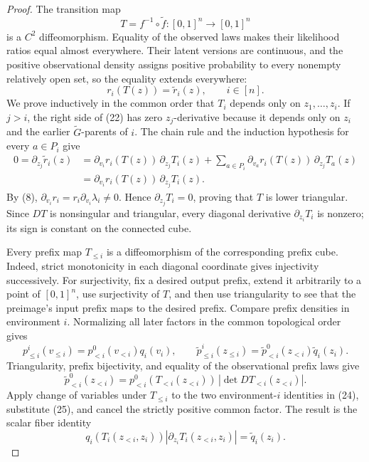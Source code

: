 \documentclass{article}
\begin{document}
\begin{proof}
The transition map
\[
 T=f^{-1}\circ\widetilde f:[0,1]^n\longrightarrow[0,1]^n
\tag{21}
\]
is a \(C^2\) diffeomorphism.  Equality of the observed laws makes their likelihood ratios equal almost everywhere.  Their latent versions are continuous, and the positive observational density assigns positive probability to every nonempty relatively open set, so the equality extends everywhere:
\[
 r_i(T(z))=\widetilde r_i(z),\qquad i\in[n].
\tag{22}
\]
We prove inductively in the common order that \(T_i\) depends only on \(z_1,\ldots,z_i\).  If \(j>i\), the right side of (22) has zero \(z_j\)-derivative because it depends only on \(z_i\) and the earlier \(\widetilde G\)-parents of \(i\).  The chain rule and the induction hypothesis for every \(a\in P_i\) give
\[
 \begin{aligned}
 0=\partial_{z_j}\widetilde r_i(z)
 &=\partial_{v_i}r_i(T(z))\,\partial_{z_j}T_i(z)
 +\sum_{a\in P_i}\partial_{v_a}r_i(T(z))\,\partial_{z_j}T_a(z)\\
 &=\partial_{v_i}r_i(T(z))\,\partial_{z_j}T_i(z).
 \end{aligned}
\tag{23}
\]
By (8), \(\partial_{v_i}r_i=r_i\partial_{v_i}\lambda_i\ne0\).  Hence \(\partial_{z_j}T_i=0\), proving that \(T\) is lower triangular.  Since \(DT\) is nonsingular and triangular, every diagonal derivative \(\partial_{z_i}T_i\) is nonzero; its sign is constant on the connected cube.

Every prefix map \(T_{\le i}\) is a diffeomorphism of the corresponding prefix cube.  Indeed, strict monotonicity in each diagonal coordinate gives injectivity successively.  For surjectivity, fix a desired output prefix, extend it arbitrarily to a point of \([0,1]^n\), use surjectivity of \(T\), and then use triangularity to see that the preimage's input prefix maps to the desired prefix.  Compare prefix densities in environment \(i\).  Normalizing all later factors in the common topological order gives
\[
 p^i_{\le i}(v_{\le i})=p^0_{<i}(v_{<i})q_i(v_i),
 \qquad
 \widetilde p^i_{\le i}(z_{\le i})
 =\widetilde p^0_{<i}(z_{<i})\widetilde q_i(z_i).
\tag{24}
\]
Triangularity, prefix bijectivity, and equality of the observational prefix laws give
\[
 \widetilde p^0_{<i}(z_{<i})
 =p^0_{<i}(T_{<i}(z_{<i}))\,|\det DT_{<i}(z_{<i})|.
\tag{25}
\]
Apply change of variables under \(T_{\le i}\) to the two environment-\(i\) identities in (24), substitute (25), and cancel the strictly positive common factor.  The result is the scalar fiber identity
\[
 q_i(T_i(z_{<i},z_i))
 \left|\partial_{z_i}T_i(z_{<i},z_i)\right|
 =\widetilde q_i(z_i).
\tag{26}
\]


\end{proof}
\end{document}
